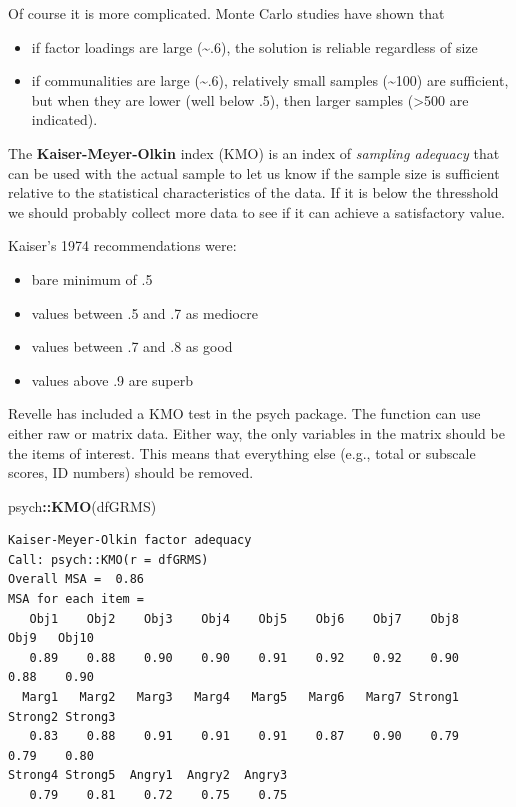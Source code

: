 \documentclass[
  english,
]{book}
\newenvironment{Shaded}{\begin{snugshade}}{\end{snugshade}}
\newcommand{\KeywordTok}[1]{\textcolor[rgb]{0.13,0.29,0.53}{\textbf{#1}}}
\newcommand{\NormalTok}[1]{#1}
\newcommand{\OperatorTok}[1]{\textcolor[rgb]{0.81,0.36,0.00}{\textbf{#1}}}
\providecommand{\tightlist}{%
  \setlength{\itemsep}{0pt}\setlength{\parskip}{0pt}}
\begin{document}
Of course it is more complicated. Monte Carlo studies have shown that

\begin{itemize}
\tightlist
\item
  if factor loadings are large (\textasciitilde.6), the solution is reliable regardless of size
\item
  if communalities are large (\textasciitilde.6), relatively small samples (\textasciitilde100) are sufficient, but when they are lower (well below .5), then larger samples (\textgreater500 are indicated).
\end{itemize}

The \textbf{Kaiser-Meyer-Olkin} index (KMO) is an index of \emph{sampling adequacy} that can be used with the actual sample to let us know if the sample size is sufficient relative to the statistical characteristics of the data. If it is below the thresshold we should probably collect more data to see if it can achieve a satisfactory value.

Kaiser's 1974 recommendations were:

\begin{itemize}
\tightlist
\item
  bare minimum of .5
\item
  values between .5 and .7 as mediocre
\item
  values between .7 and .8 as good
\item
  values above .9 are superb
\end{itemize}

Revelle has included a KMO test in the psych package. The function can use either raw or matrix data. Either way, the only variables in the matrix should be the items of interest. This means that everything else (e.g., total or subscale scores, ID numbers) should be removed.

\begin{Shaded}
\begin{Highlighting}[]
\NormalTok{psych}\OperatorTok{::}\KeywordTok{KMO}\NormalTok{(dfGRMS)}
\end{Highlighting}
\end{Shaded}

\begin{verbatim}
Kaiser-Meyer-Olkin factor adequacy
Call: psych::KMO(r = dfGRMS)
Overall MSA =  0.86
MSA for each item = 
   Obj1    Obj2    Obj3    Obj4    Obj5    Obj6    Obj7    Obj8    Obj9   Obj10 
   0.89    0.88    0.90    0.90    0.91    0.92    0.92    0.90    0.88    0.90 
  Marg1   Marg2   Marg3   Marg4   Marg5   Marg6   Marg7 Strong1 Strong2 Strong3 
   0.83    0.88    0.91    0.91    0.91    0.87    0.90    0.79    0.79    0.80 
Strong4 Strong5  Angry1  Angry2  Angry3 
   0.79    0.81    0.72    0.75    0.75 
\end{verbatim}
\end{document}
